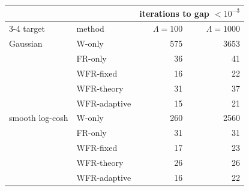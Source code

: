 \begin{tabular}{ll rr}
\toprule
 & & \multicolumn{2}{c}{iterations to gap $<10^{-3}$} \\
\cmidrule(lr){3-4}
target & method & $\Lambda{=}100$ & $\Lambda{=}1000$ \\
\midrule
Gaussian & W-only & 575 & 3653 \\
 & FR-only & 36 & 41 \\
 & WFR-fixed & 16 & 22 \\
 & WFR-theory & 31 & 37 \\
 & WFR-adaptive & 15 & 21 \\
\midrule
smooth log-cosh & W-only & 260 & 2560 \\
 & FR-only & 31 & 31 \\
 & WFR-fixed & 17 & 23 \\
 & WFR-theory & 26 & 26 \\
 & WFR-adaptive & 16 & 22 \\
\bottomrule
\end{tabular}
